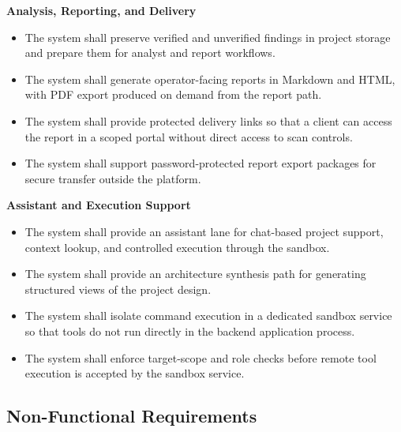 \documentclass[12pt,a4paper]{report}
\begin{document}
\textbf{Analysis, Reporting, and Delivery}
\begin{itemize}
    \item The system shall preserve verified and unverified findings in project
    storage and prepare them for analyst and report workflows.
    \item The system shall generate operator-facing reports in Markdown and HTML,
    with PDF export produced on demand from the report path.
    \item The system shall provide protected delivery links so that a client can
    access the report in a scoped portal without direct access to scan controls.
    \item The system shall support password-protected report export packages for
    secure transfer outside the platform.
\end{itemize}

\textbf{Assistant and Execution Support}
\begin{itemize}
    \item The system shall provide an assistant lane for chat-based project support,
    context lookup, and controlled execution through the sandbox.
    \item The system shall provide an architecture synthesis path for generating
    structured views of the project design.
    \item The system shall isolate command execution in a dedicated sandbox service
    so that tools do not run directly in the backend application process.
    \item The system shall enforce target-scope and role checks before remote tool
    execution is accepted by the sandbox service.
\end{itemize}

\subsection{Non-Functional Requirements}
\end{document}
